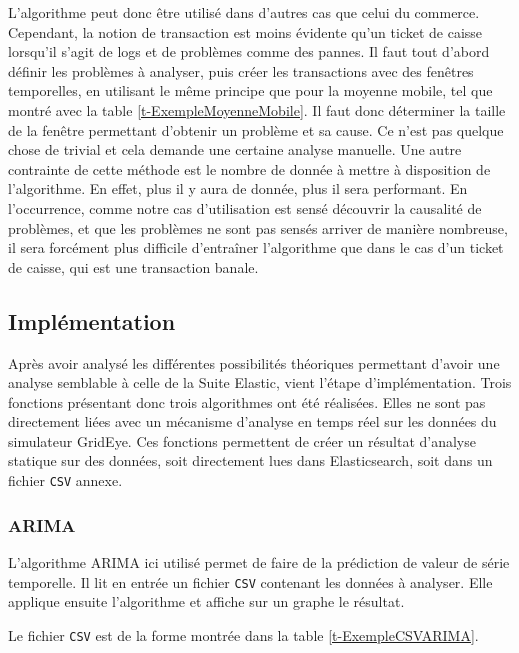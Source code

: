 \documentclass[paper=a4, fontsize=11pt]{scrartcl}
\begin{document}
L'algorithme peut donc être utilisé dans d'autres cas que celui du commerce. Cependant, la notion de transaction est moins évidente qu'un ticket de caisse lorsqu'il s'agit de logs et de problèmes comme des pannes. Il faut tout d'abord définir les problèmes à analyser, puis créer les transactions avec des fenêtres temporelles, en utilisant le même principe que pour la moyenne mobile, tel que montré avec la table \ref{t-ExempleMoyenneMobile}. Il faut donc déterminer la taille de la fenêtre permettant d'obtenir un problème et sa cause. Ce n'est pas quelque chose de trivial et cela demande une certaine analyse manuelle.\newline
Une autre contrainte de cette méthode est le nombre de donnée à mettre à disposition de l'algorithme. En effet, plus il y aura de donnée, plus il sera performant. En l'occurrence, comme notre cas d'utilisation est sensé découvrir la causalité de problèmes, et que les problèmes ne sont pas sensés arriver de manière nombreuse, il sera forcément plus difficile d'entraîner l'algorithme que dans le cas d'un ticket de caisse, qui est une transaction banale.

\subsection{Implémentation}

Après avoir analysé les différentes possibilités théoriques permettant d'avoir une analyse semblable à celle de la Suite Elastic, vient l'étape d'implémentation. Trois fonctions présentant donc trois algorithmes ont été réalisées. Elles ne sont pas directement liées avec un mécanisme d'analyse en temps réel sur les données du simulateur GridEye. Ces fonctions permettent de créer un résultat d'analyse statique sur des données, soit directement lues dans Elasticsearch, soit dans un fichier \verb,CSV, annexe.

\subsubsection{ARIMA}
L'algorithme ARIMA ici utilisé permet de faire de la prédiction de valeur de série temporelle. Il lit en entrée un fichier \verb,CSV, contenant les données à analyser. Elle applique ensuite l'algorithme et affiche sur un graphe le résultat.

Le fichier \verb,CSV, est de la forme montrée dans la table \ref{t-ExempleCSVARIMA}.
\end{document}

